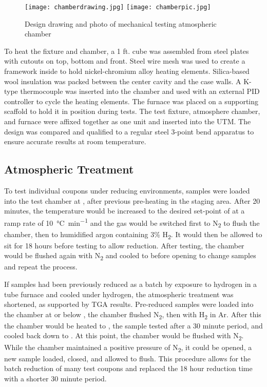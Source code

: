         \begin{figure}
            \texttt{[image: chamberdrawing.jpg]}
            \texttt{[image: chamberpic.jpg]}
            \caption{Design drawing and photo of mechanical testing atmospheric chamber}
            \label{fig:chamber}
        \end{figure}

        To heat the fixture and chamber, a 1 ft. cube was assembled from steel plates with cutouts on top, bottom and front.
        Steel wire mesh was used to create a framework inside to hold nickel-chromium alloy heating elements.
        Silica-based wool insulation was packed between the center cavity and the case walls.
        A K-type thermocouple was inserted into the chamber and used with an external PID controller to cycle the heating elements.
        The furnace was placed on a supporting scaffold to hold it in position during tests.
        The test fixture, atmosphere chamber, and furnace were affixed together as one unit and inserted into the UTM.
        The design was compared and qualified to a regular steel 3-point bend apparatus to ensure accurate results at room temperature.

    \subsection{Atmospheric Treatment}
        To test individual coupons under reducing environments, samples were loaded into the test chamber at , after previous pre-heating in the staging area.
        After 20 minutes, the temperature would be increased to the desired set-point of  at a ramp rate of \SI{10}{\celsius\per\minute} and the gas would be switched first to N\textsubscript{2} to flush the chamber, then to humidified argon containing 3\% H\textsubscript{2}.
        It would then be allowed to sit for 18 hours before testing to allow reduction.
        After testing, the chamber would be flushed again with N\textsubscript{2} and cooled to  before opening to change samples and repeat the process.

        If samples had been previously reduced as a batch by exposure to hydrogen in a tube furnace and cooled under hydrogen, the atmospheric treatment was shortened, as supported by TGA results.
        Pre-reduced samples were loaded into the chamber at or below , the chamber flushed N\textsubscript{2}, then with H\textsubscript{2} in Ar.
        After this the chamber would be heated to , the sample tested after a 30
        minute period, and cooled back down to .
        At this point, the chamber would be flushed with N\textsubscript{2}.
        While the chamber maintained a positive pressure of N\textsubscript{2}, it could be opened, a new sample loaded, closed, and allowed to flush.
        This procedure allows for the batch reduction of many test coupons and replaced the 18 hour reduction time with a shorter 30 minute period.


